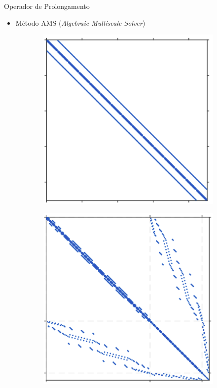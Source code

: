 \documentclass[professionalfont]{beamer}
\begin{document}
\begin{frame}{Operador de Prolongamento}
    \small
    \begin{itemize}
        \item  Método AMS (\textit{Algebraic Multiscale Solver}) \cite{Wang2015}
    \end{itemize}

    \begin{figure}[!ht]
        
        \begin{subfigure}{.3\textwidth}
            \centering
            \includegraphics[scale=0.27]{./imgs/im10.png}
            \subcaption{$\fineTransmissibility$}
            \label{fig:multiescala.4.a}
        \end{subfigure}
        \begin{subfigure}{.3\textwidth}
            \centering
            \includegraphics[scale=0.27]{./imgs/im11.png}

\end{subfigure}
\end{figure}
\end{frame}
\end{document}
